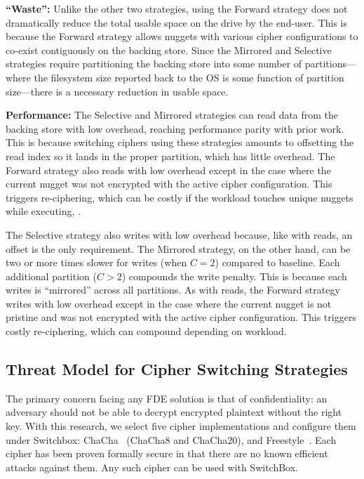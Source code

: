 \textbf{``Waste'':} Unlike the other two strategies, using
the Forward strategy does not dramatically reduce the total usable space on the
drive by the end-user. This is because the Forward strategy allows nuggets with
various cipher configurations to co-exist contiguously on the backing store.
Since the Mirrored and Selective strategies require partitioning the backing
store into some number of partitions---where the filesystem size reported back
to the OS is some function of partition size---there is a necessary reduction in
usable space.

\textbf{Performance:} The Selective and Mirrored strategies can read data
from the backing store with low overhead, reaching performance parity with prior
work. This is because switching ciphers using these strategies amounts to
offsetting the read index so it lands in the proper partition, which has little
overhead. The Forward strategy also reads with low overhead except in the case
where the current nugget was not encrypted with the active cipher configuration.
This triggers re-ciphering, which can be costly if the workload touches unique
nuggets while executing, .

The Selective strategy also writes with low overhead because, like with reads,
an offset is the only requirement. The Mirrored strategy, on the other hand, can
be two or more times slower for writes (when $C = 2$) compared to baseline. Each
additional partition ($C > 2$) compounds the write penalty. This is because each
writes is ``mirrored'' across all partitions. As with reads, the Forward
strategy writes with low overhead except in the case where the current nugget is
not pristine and was not encrypted with the active cipher configuration. This
triggers costly re-ciphering, which can compound depending on workload.

\subsection{Threat Model for Cipher Switching Strategies}

The primary concern facing any FDE solution is that of confidentiality: an
adversary should not be able to decrypt encrypted plaintext without the right
key. With this research, we select five cipher implementations and configure
them under Switchbox: ChaCha~\cite{ChaCha20} (ChaCha8 and ChaCha20), and
Freestyle~\cite{Freestyle}. Each cipher has been proven formally secure in that
there are no known efficient attacks against them. Any such cipher can be used
with SwitchBox.

